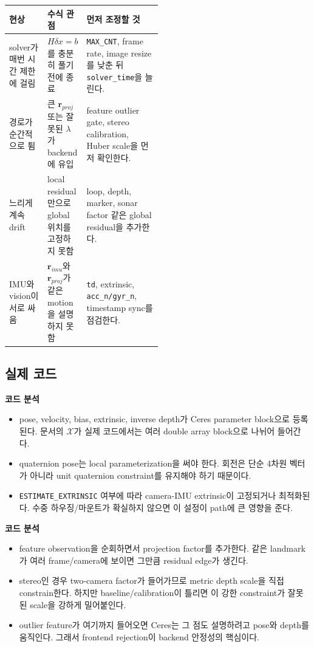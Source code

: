 \documentclass[11pt,a4paper]{article}
\newcommand{\code}[1]{\texttt{#1}}
\newcommand{\codeheading}[1]{\par\vspace{6pt}\noindent{\footnotesize\bfseries\textcolor{codeemph}{#1}}\par\vspace{2pt}}
\newcommand{\readpoint}[1]{\par\noindent{\footnotesize\textcolor{muted}{읽는 포인트: #1}}\par\vspace{2pt}}
\newenvironment{codeanalysis}{%
  \par\vspace{2pt}\noindent
  {\footnotesize\bfseries\textcolor{accentblue}{코드 분석}}\par
  \begin{itemize}[leftmargin=1.35em,topsep=2pt,itemsep=1pt,parsep=0pt]
  \footnotesize
}{%
  \end{itemize}
  \vspace{6pt}
}
\begin{document}
\begin{tabularx}{\linewidth}{p{0.25\linewidth}p{0.25\linewidth}Y}
\toprule
\textbf{현상} & \textbf{수식 관점} & \textbf{먼저 조정할 것} \\
\midrule
solver가 매번 시간 제한에 걸림 & \(H\delta x=b\)를 충분히 풀기 전에 종료 & \code{MAX\_CNT}, frame rate, image resize를 낮춘 뒤 \code{solver\_time}을 늘린다. \\
경로가 순간적으로 튐 & 큰 \(\mathbf{r}_{proj}\) 또는 잘못된 \(\lambda\)가 backend에 유입 & feature outlier gate, stereo calibration, Huber scale을 먼저 확인한다. \\
느리게 계속 drift & local residual만으로 global 위치를 고정하지 못함 & loop, depth, marker, sonar factor 같은 global residual을 추가한다. \\
IMU와 vision이 서로 싸움 & \(\mathbf{r}_{imu}\)와 \(\mathbf{r}_{proj}\)가 같은 motion을 설명하지 못함 & \code{td}, extrinsic, \code{acc\_n/gyr\_n}, timestamp sync를 점검한다. \\
\bottomrule
\end{tabularx}

\subsection*{실제 코드}

\readpoint{상태 변수 block을 Ceres problem에 올리고, 이후 visual/IMU/prior residual이 붙는다.}
\codeheading{estimator.cpp:1004--1060}

\begin{codeanalysis}
  \item pose, velocity, bias, extrinsic, inverse depth가 Ceres parameter block으로 등록된다. 문서의 \(\mathcal{X}\)가 실제 코드에서는 여러 double array block으로 나뉘어 들어간다.
  \item quaternion pose는 local parameterization을 써야 한다. 회전은 단순 4차원 벡터가 아니라 unit quaternion constraint를 유지해야 하기 때문이다.
  \item \code{ESTIMATE\_EXTRINSIC} 여부에 따라 camera-IMU extrinsic이 고정되거나 최적화된다. 수중 하우징/마운트가 확실하지 않으면 이 설정이 path에 큰 영향을 준다.
\end{codeanalysis}

\codeheading{estimator.cpp:1064--1104}

\begin{codeanalysis}
  \item feature observation을 순회하면서 projection factor를 추가한다. 같은 landmark가 여러 frame/camera에 보이면 그만큼 residual edge가 생긴다.
  \item stereo인 경우 two-camera factor가 들어가므로 metric depth scale을 직접 constrain한다. 하지만 baseline/calibration이 틀리면 이 강한 constraint가 잘못된 scale을 강하게 밀어붙인다.
  \item outlier feature가 여기까지 들어오면 Ceres는 그 점도 설명하려고 pose와 depth를 움직인다. 그래서 frontend rejection이 backend 안정성의 핵심이다.
\end{codeanalysis}
\end{document}
